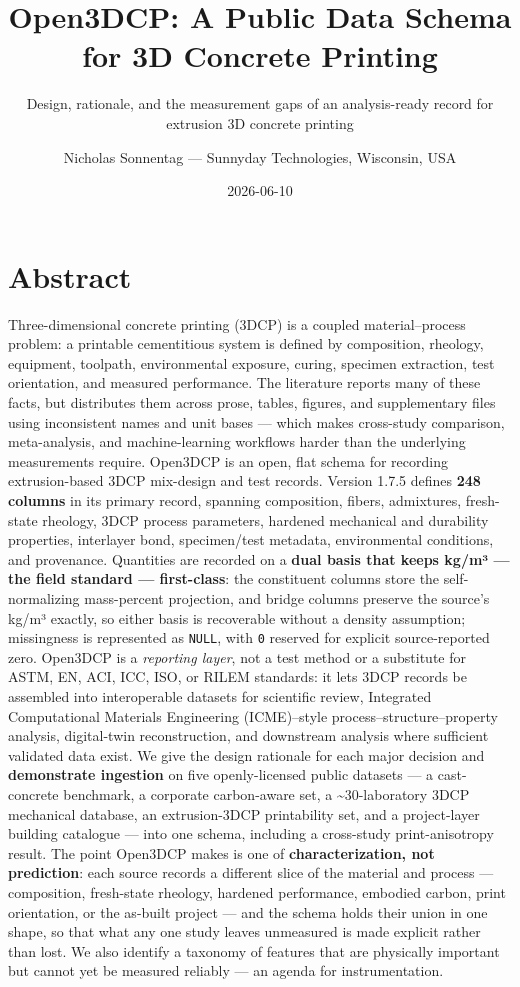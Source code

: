\documentclass[
  11pt,
  letterpaper,
]{article}
\title{Open3DCP: A Public Data Schema for 3D Concrete Printing}
\subtitle{Design, rationale, and the measurement gaps of an
analysis-ready record for extrusion 3D concrete printing}
\author{Nicholas Sonnentag --- Sunnyday Technologies, Wisconsin, USA}
\date{2026-06-10}
\begin{document}
\maketitle

{
\setcounter{tocdepth}{2}
\tableofcontents
}
\section{Abstract}\label{abstract}

Three-dimensional concrete printing (3DCP) is a coupled
material--process problem: a printable cementitious system is defined by
composition, rheology, equipment, toolpath, environmental exposure,
curing, specimen extraction, test orientation, and measured performance.
The literature reports many of these facts, but distributes them across
prose, tables, figures, and supplementary files using inconsistent names
and unit bases --- which makes cross-study comparison, meta-analysis,
and machine-learning workflows harder than the underlying measurements
require. Open3DCP is an open, flat schema for recording extrusion-based
3DCP mix-design and test records. Version 1.7.5 defines \textbf{248
columns} in its primary record, spanning composition, fibers,
admixtures, fresh-state rheology, 3DCP process parameters, hardened
mechanical and durability properties, interlayer bond, specimen/test
metadata, environmental conditions, and provenance. Quantities are
recorded on a \textbf{dual basis that keeps kg/m³ --- the field standard
--- first-class}: the constituent columns store the self-normalizing
mass-percent projection, and bridge columns preserve the source's kg/m³
exactly, so either basis is recoverable without a density assumption;
missingness is represented as \texttt{NULL}, with \texttt{0} reserved
for explicit source-reported zero. Open3DCP is a \emph{reporting layer},
not a test method or a substitute for ASTM, EN, ACI, ICC, ISO, or RILEM
standards: it lets 3DCP records be assembled into interoperable datasets
for scientific review, Integrated Computational Materials Engineering
(ICME)--style process--structure--property analysis, digital-twin
reconstruction, and downstream analysis where sufficient validated data
exist. We give the design rationale for each major decision and
\textbf{demonstrate ingestion} on five openly-licensed public datasets
--- a cast-concrete benchmark, a corporate carbon-aware set, a
\textasciitilde30-laboratory 3DCP mechanical database, an extrusion-3DCP
printability set, and a project-layer building catalogue --- into one
schema, including a cross-study print-anisotropy result. The point
Open3DCP makes is one of \textbf{characterization, not prediction}: each
source records a different slice of the material and process ---
composition, fresh-state rheology, hardened performance, embodied
carbon, print orientation, or the as-built project --- and the schema
holds their union in one shape, so that what any one study leaves
unmeasured is made explicit rather than lost. We also identify a
taxonomy of features that are physically important but cannot yet be
measured reliably --- an agenda for instrumentation.
\end{document}
